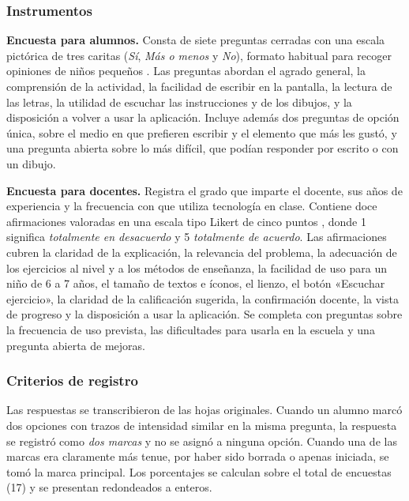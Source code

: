 \subsubsection{Instrumentos}
\textbf{Encuesta para alumnos.} Consta de siete preguntas cerradas con una escala pictórica de tres caritas (\textit{Sí}, \textit{Más o menos} y \textit{No}), formato habitual para recoger opiniones de niños pequeños \cite{read2006funtoolkit}. Las preguntas abordan el agrado general, la comprensión de la actividad, la facilidad de escribir en la pantalla, la lectura de las letras, la utilidad de escuchar las instrucciones y de los dibujos, y la disposición a volver a usar la aplicación. Incluye además dos preguntas de opción única, sobre el medio en que prefieren escribir y el elemento que más les gustó, y una pregunta abierta sobre lo más difícil, que podían responder por escrito o con un dibujo.

\textbf{Encuesta para docentes.} Registra el grado que imparte el docente, sus años de experiencia y la frecuencia con que utiliza tecnología en clase. Contiene doce afirmaciones valoradas en una escala tipo Likert de cinco puntos \cite{likert1932technique}, donde 1 significa \textit{totalmente en desacuerdo} y 5 \textit{totalmente de acuerdo}. Las afirmaciones cubren la claridad de la explicación, la relevancia del problema, la adecuación de los ejercicios al nivel y a los métodos de enseñanza, la facilidad de uso para un niño de 6 a 7 años, el tamaño de textos e íconos, el lienzo, el botón «Escuchar ejercicio», la claridad de la calificación sugerida, la confirmación docente, la vista de progreso y la disposición a usar la aplicación. Se completa con preguntas sobre la frecuencia de uso prevista, las dificultades para usarla en la escuela y una pregunta abierta de mejoras.

\subsubsection{Criterios de registro}
Las respuestas se transcribieron de las hojas originales. Cuando un alumno marcó dos opciones con trazos de intensidad similar en la misma pregunta, la respuesta se registró como \textit{dos marcas} y no se asignó a ninguna opción. Cuando una de las marcas era claramente más tenue, por haber sido borrada o apenas iniciada, se tomó la marca principal. Los porcentajes se calculan sobre el total de encuestas (17) y se presentan redondeados a enteros.
